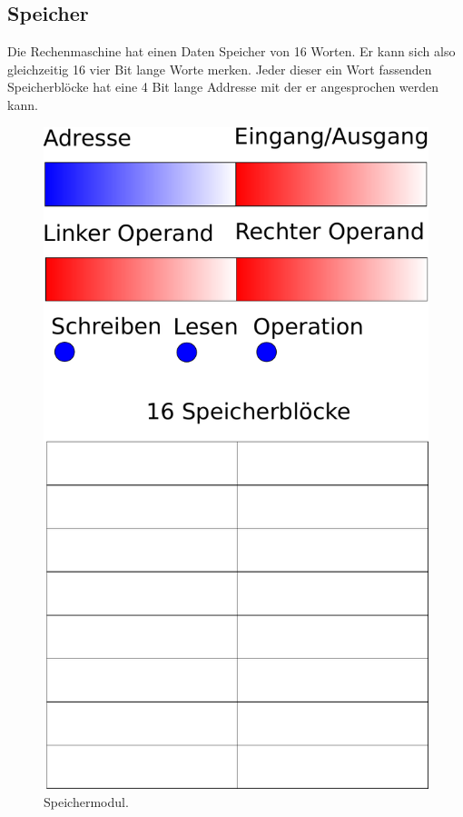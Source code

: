 \documentclass[11pt,a4paper,leqno]{report}
\numberwithin{equation}{chapter}
\begin{document}
\subsection{Speicher}
Die Rechenmaschine hat einen Daten Speicher von 16 Worten. Er kann sich also gleichzeitig 16 vier Bit lange Worte merken. Jeder dieser ein Wort fassenden Speicherbl\"ocke hat eine 4 Bit lange Addresse mit der er angesprochen werden kann.
\begin{figure}[H]
	\begin{center}
		\includegraphics[scale=0.3]{Speicher.pdf}
		\caption{Speichermodul.}
	\end{center}
\end{figure}
\end{document}
